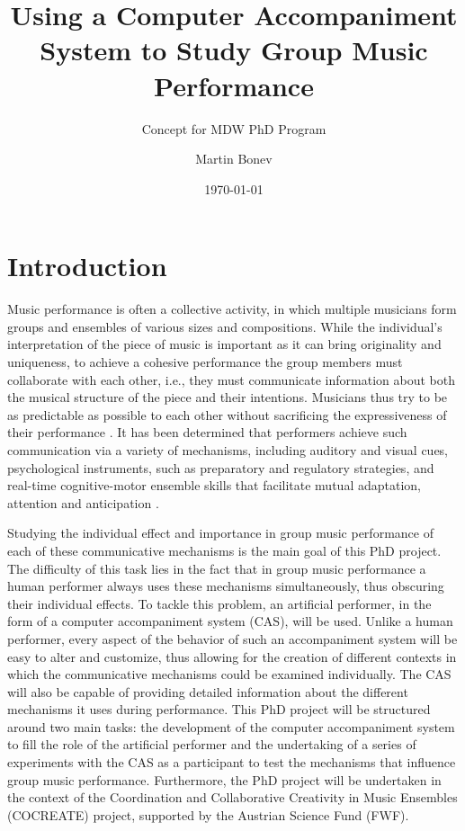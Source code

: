 \documentclass[12pt]{scrartcl}
\title{Using a Computer Accompaniment System to Study Group Music Performance} %
\subtitle{Concept for MDW PhD Program}
\author{Martin Bonev}
\date{\today}
\begin{document}
\maketitle

\section{Introduction}
\label{introduction}

Music performance is often a collective activity, in which multiple musicians form groups and ensembles of various sizes and compositions. While the individual's interpretation of the piece of music is important as it can bring originality and uniqueness, to achieve a cohesive performance the group members must collaborate with each other, i.e., they must communicate information about both the musical structure of the piece and their intentions. Musicians thus try to be as predictable as possible to each other without sacrificing the expressiveness of their performance \citep{laura}. It has been determined that performers achieve such communication via a variety of mechanisms, including auditory and visual cues, psychological instruments, such as preparatory and regulatory strategies, and real-time cognitive-motor ensemble skills that facilitate mutual adaptation, attention and anticipation \citep{keller-stuff}.

Studying the individual effect and importance in group music performance of each of these communicative mechanisms is the main goal of this PhD project. The difficulty of this task lies in the fact that in group music performance a human performer always uses these mechanisms simultaneously, thus obscuring their individual effects. To tackle this problem, an artificial performer, in the form of a computer accompaniment system (CAS), will be used. Unlike a human performer, every aspect of the behavior of such an accompaniment system will be easy to alter and customize, thus allowing for the creation of different contexts in which the communicative mechanisms could be examined individually. The CAS will also be capable of providing detailed information about the different mechanisms it uses during performance. This PhD project will be structured around two main tasks: the development of the computer accompaniment system to fill the role of the artificial performer and the undertaking of a series of experiments with the CAS as a participant to test the mechanisms that influence group music performance. Furthermore, the PhD project will be undertaken in the context of the Coordination and Collaborative Creativity in Music Ensembles (COCREATE) project, supported by the Austrian Science Fund (FWF). 
\end{document}
